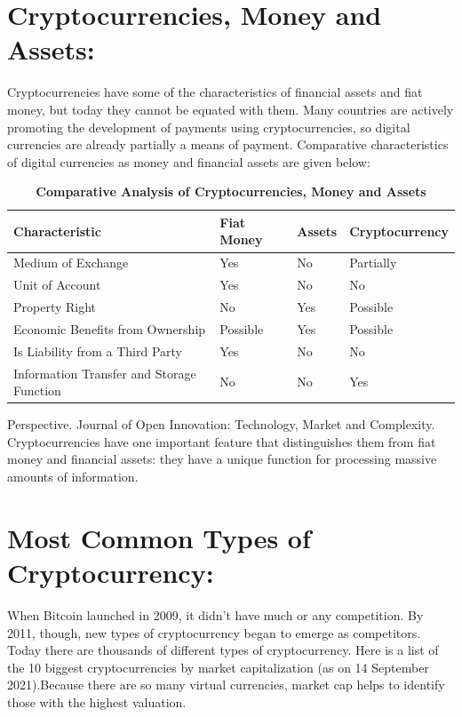 \documentclass[11pt]{article}
\begin{document}
\section*{Cryptocurrencies, Money and Assets:}
Cryptocurrencies have some of the characteristics of financial assets and fiat money, but today they cannot be equated with them. Many countries are actively promoting the development of payments using cryptocurrencies, so digital currencies are already partially a means of payment. 
Comparative characteristics of digital currencies as money and financial assets are given below: 
\begin{longtable}[c]{|l|l|l|l|}
    \caption{\textbf{Comparative Analysis of Cryptocurrencies, Money and Assets}} \\
    \hline
    \textbf{Characteristic} & \textbf{Fiat Money} & \textbf{Assets} & \textbf{Cryptocurrency} \\ \hline
    \endfirsthead

    \hline
    
    \endhead

    \hline
    \endfoot

    Medium of Exchange & Yes & No & Partially \\ \hline
    Unit of Account & Yes & No & No \\ \hline
    Property Right & No & Yes & Possible \\ \hline
    Economic Benefits from Ownership & Possible & Yes & Possible \\ \hline
    Is Liability from a Third Party & Yes & No & No \\ \hline
    Information Transfer and Storage Function & No & No & Yes \\ \hline
\end{longtable}
\noindent Perspective. Journal of Open Innovation: Technology, Market and Complexity. \\
\indent Cryptocurrencies have one important feature that distinguishes them from fiat money and 
financial assets: they have a unique function for processing massive amounts of information. 


\section*{Most Common Types of Cryptocurrency:}
When Bitcoin launched in 2009, it didn’t have much or any competition. By 2011, though, new types of cryptocurrency began to emerge as competitors. Today there are thousands of different types of cryptocurrency. Here is a list of the 10 biggest cryptocurrencies by market capitalization (as on 14 September 2021).Because there are so many virtual currencies, market cap helps to identify those with the highest valuation. 
\end{document}
